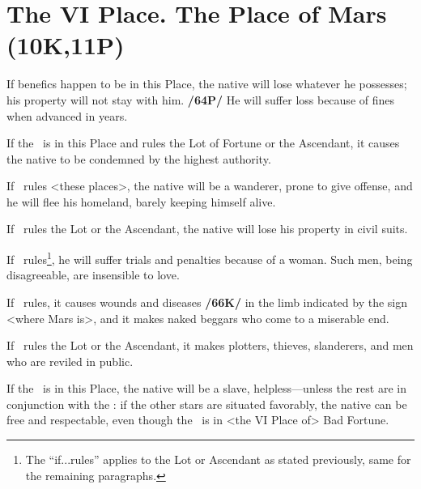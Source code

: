 \section{The VI Place. The Place of Mars (10K,11P)}
If benefics happen to be in this Place, the native will lose whatever he possesses; his property will not stay with him. \textbf{/64P/} He will suffer loss because of fines when advanced in years. 

If the \Sun\, is in this Place and rules the Lot of Fortune or the Ascendant, it causes the native to be condemned by the highest authority. 

If \Saturn\, rules <these places>, the native will be a wanderer, prone to give offense, and he will flee his homeland, barely keeping himself alive. 

If \Jupiter\, rules the Lot or the Ascendant, the native will lose his property in civil suits. 

If \Venus\, rules\footnote{The ``if...rules'' applies to the Lot or Ascendant as stated previously, same for the remaining paragraphs.}, he will suffer trials and penalties because of a woman. Such men, being disagreeable, are insensible to love. 

If \Mars\, rules, it causes wounds and diseases \textbf{/66K/} in the limb indicated by the sign <where Mars is>, and it makes naked beggars who come to a miserable end. 

If \Mercury\, rules the Lot or the Ascendant, it makes plotters, thieves, slanderers, and men who are reviled in public. 

If the \Moon\, is in this Place, the native will be a slave, helpless—unless the rest are in conjunction with the \Moon: if the other stars are situated favorably, the native can be free and respectable, even though the \Moon\, is in <the VI Place of> Bad Fortune.

\newpage